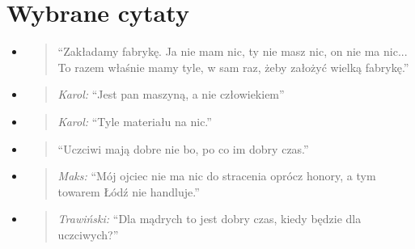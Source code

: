 \documentclass[a4paper]{article}
\begin{document}
\section{Wybrane cytaty}
\begin{itemize}
    
    \item\begin{quote}
        ``Zakładamy fabrykę. Ja nie mam nic, ty nie masz nic, on nie ma nic... To razem właśnie mamy tyle, w sam raz, żeby założyć wielką fabrykę.''
    \end{quote}
    \item\begin{quote}
        \emph{Karol:} ``Jest pan maszyną, a nie człowiekiem''
    \end{quote}
    \item\begin{quote}
        \emph{Karol:} ``Tyle materiału na nic.''
    \end{quote}
    \item\begin{quote}
        ``Uczciwi mają dobre nie bo, po co im dobry czas.''
    \end{quote}
    \item\begin{quote}
        \emph{Maks:} ``Mój ojciec nie ma nic do stracenia oprócz honory, a tym towarem Łódź nie handluje.''
    \end{quote}
    \item\begin{quote}
        \emph{Trawiński:} ``Dla mądrych to jest dobry czas, kiedy będzie dla uczciwych?''
    \end{quote}
\end{itemize}
    
\end{document}
